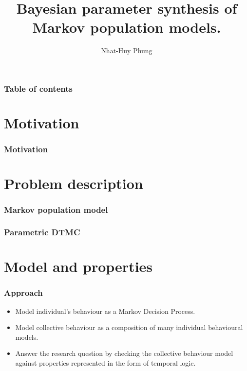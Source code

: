 \documentclass{beamer}
\begin{document}
\title{Bayesian parameter synthesis of Markov population models.}
\author{Nhat-Huy Phung}

\begin{frame}
  \titlepage
\end{frame}

\begin{frame}
  \frametitle{Table of contents}
  \tableofcontents
\end{frame}

\section{Motivation}
\begin{frame}
  \frametitle{Motivation}
  
\end{frame}

\section{Problem description}
\begin{frame}
  \frametitle{Markov population model}
\end{frame}

\begin{frame}
  \frametitle{Parametric DTMC}
\end{frame}

\section{Model and properties}
\begin{frame}
  \frametitle{Approach}
  \begin{itemize}
  \item Model individual's behaviour as a Markov Decision Process.
  \item Model collective behaviour as a composition of many individual
    behavioural models.
  \item Answer the research question by checking the collective behaviour model
    against properties represented in the form of temporal logic.
  \end{itemize}
\end{frame}
\end{document}

